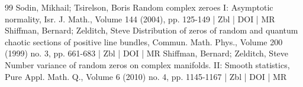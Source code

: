 \documentclass[10pt]{amsart}
\theoremstyle{definition}\newtheorem{defi}[theo]{Definition}\newtheorem{rema}[theo]{Remark}\newtheorem{exam}[theo]{Example}\newtheorem{exem}[theo]{Example}\newtheorem{nota}[theo]{Notation}
\begin{document}
\begin{thebibliography}{99}
Sodin, Mikhail; Tsirelson, Boris Random complex zeroes I: Asymptotic normality, Isr. J. Math., Volume 144 (2004), pp. 125-149 | Zbl | DOI | MR
Shiffman, Bernard; Zelditch, Steve Distribution of zeros of random and quantum chaotic sections of positive line bundles, Commun. Math. Phys., Volume 200 (1999) no. 3, pp. 661-683 | Zbl | DOI | MR
Shiffman, Bernard; Zelditch, Steve Number variance of random zeros on complex manifolds. II: Smooth statistics, Pure Appl. Math. Q., Volume 6 (2010) no. 4, pp. 1145-1167 | Zbl | DOI | MR
\end{thebibliography}
\end{document}
